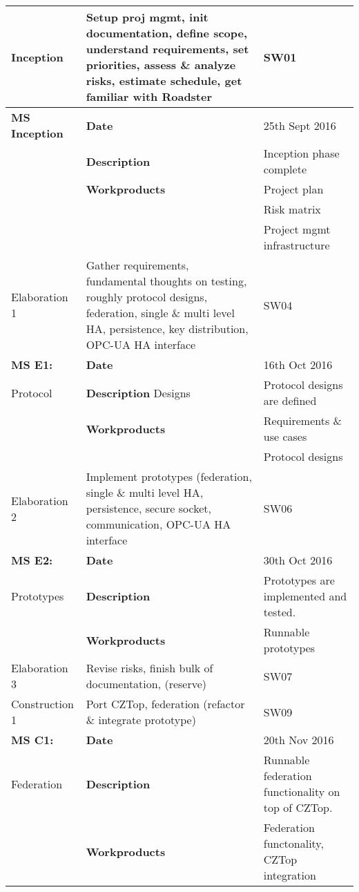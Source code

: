 \begin{center}
\begin{longtable}{ | p{25mm} | p{25mm} p{35mm}| p{5mm} | }
    \hline
    \endlastfoot
	Inception
	& \multicolumn{2}{p{70mm}|}{Setup proj mgmt, init documentation, define scope, understand requirements,
	set priorities, assess \& analyze risks, estimate schedule, get familiar with Roadster}
	& SW01 \\ \hline
	  \textbf{MS Inception}
	& \textbf{Date}
	& \multicolumn{2}{l|}{25th Sept 2016} \\
	& \textbf{Description}
	& \multicolumn{2}{l|}{Inception phase complete} \\
	& \textbf{Workproducts}
	& \multicolumn{2}{l|}{Project plan} \\
	& & \multicolumn{2}{l|}{Risk matrix} \\
	& & \multicolumn{2}{l|}{Project mgmt infrastructure} \\
	\hline
	\hline
	Elaboration 1
	& \multicolumn{2}{p{70mm}|}{Gather requirements, fundamental thoughts on testing, roughly protocol designs,
	federation, single \& multi level HA, persistence, key distribution, OPC-UA HA interface}
	& SW04 \\ \hline
	  \textbf{MS E1:}
	& \textbf{Date}
	& \multicolumn{2}{l|}{16th Oct 2016} \\
	Protocol & \textbf{Description}
	Designs & \multicolumn{2}{l|}{Protocol designs are defined} \\
	& \textbf{Workproducts}
	& \multicolumn{2}{l|}{Requirements \& use cases} \\
	&
	& \multicolumn{2}{l|}{Protocol designs} \\ \hline
	Elaboration 2
	& \multicolumn{2}{p{70mm}|}{Implement prototypes (federation, single \& multi level HA, persistence, secure socket,
	communication, OPC-UA HA interface}
	& SW06 \\ \hline
	  \textbf{MS E2:}
	& \textbf{Date}
	& \multicolumn{2}{l|}{30th Oct 2016} \\
	Prototypes & \textbf{Description}
	& \multicolumn{2}{l|}{Prototypes are implemented and tested.} \\
	& \textbf{Workproducts}
	& \multicolumn{2}{l|}{Runnable prototypes} \\
	  \hline
	  \hline
	Elaboration 3
	& \multicolumn{2}{p{70mm}|}{Revise risks, finish bulk of documentation, (reserve)}
	& SW07 \\ \hline
	Construction 1
	& \multicolumn{2}{p{70mm}|}{Port CZTop, federation (refactor \& integrate prototype)}
	& SW09 \\ \hline
	\textbf{MS C1:}
	& \textbf{Date}
	& \multicolumn{2}{l|}{20th Nov 2016} \\
	Federation & \textbf{Description}
	& \multicolumn{2}{l|}{Runnable federation functionality on top of CZTop.} \\
	& \textbf{Workproducts}
	& \multicolumn{2}{l|}{Federation functonality, CZTop integration} \\
	\hline
	\hline


\end{longtable}
\end{center}
